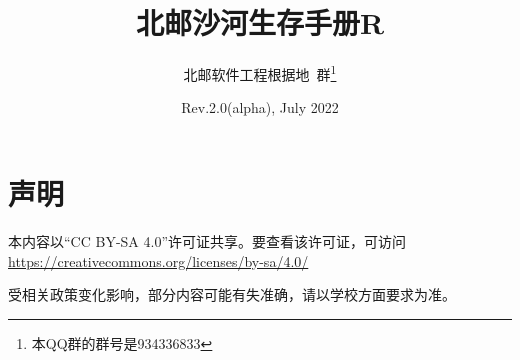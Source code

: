 \documentclass[UTF8]{ctexart}
\title{\textbf{北邮沙河生存手册R}}
\author{北邮软件工程根据地\ 群\thanks{本QQ群的群号是934336833}}
\date{Rev.2.0(alpha), July 2022}
\begin{document}
\maketitle
\section*{声明}
\begin{center}
    本内容以“CC BY-SA 4.0”许可证共享。要查看该许可证，可访问\\
    \href{https://creativecommons.org/licenses/by-sa/4.0/}{https://creativecommons.org/licenses/by-sa/4.0/}

    受相关政策变化影响，部分内容可能有失准确，请以学校方面要求为准。
\end{center}
\tableofcontents
\newpage


















\end{document}
